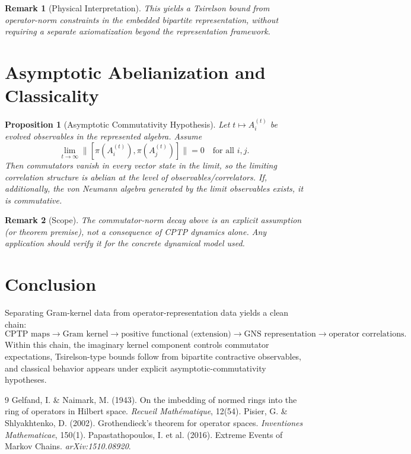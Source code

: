 \documentclass[11pt, a4paper]{article}
\newtheorem{proposition}{Proposition}
\newtheorem{remark}{Remark}
\begin{document}
\begin{remark}[Physical Interpretation]
This yields a Tsirelson bound from operator-norm constraints in the embedded bipartite representation, without requiring a separate axiomatization beyond the representation framework.
\end{remark}

\section{Asymptotic Abelianization and Classicality}

\begin{proposition}[Asymptotic Commutativity Hypothesis]
Let $t\mapsto A_i^{(t)}$ be evolved observables in the represented algebra. Assume
\begin{equation}
\lim_{t\to\infty}\|[\pi(A_i^{(t)}),\pi(A_j^{(t)})]\|=0\quad\text{for all }i,j.
\end{equation}
Then commutators vanish in every vector state in the limit, so the limiting correlation structure is abelian at the level of observables/correlators. If, additionally, the von Neumann algebra generated by the limit observables exists, it is commutative.
\end{proposition}

\begin{remark}[Scope]
The commutator-norm decay above is an explicit assumption (or theorem premise), not a consequence of CPTP dynamics alone. Any application should verify it for the concrete dynamical model used.
\end{remark}

\section{Conclusion}

Separating Gram-kernel data from operator-representation data yields a clean chain:
\[
\text{CPTP maps}\to \text{Gram kernel}\to \text{positive functional (extension)}\to \text{GNS representation}\to \text{operator correlations}.
\]
Within this chain, the imaginary kernel component controls commutator expectations, Tsirelson-type bounds follow from bipartite contractive observables, and classical behavior appears under explicit asymptotic-commutativity hypotheses.

\begin{thebibliography}{9}
 Gelfand, I. \& Naimark, M. (1943). On the imbedding of normed rings into the ring of operators in Hilbert space. \textit{Recueil Math\'ematique}, 12(54).
 Pisier, G. \& Shlyakhtenko, D. (2002). Grothendieck's theorem for operator spaces. \textit{Inventiones Mathematicae}, 150(1).
 Papastathopoulos, I. et al. (2016). Extreme Events of Markov Chains. \textit{arXiv:1510.08920}.
\end{thebibliography}
\end{document}
